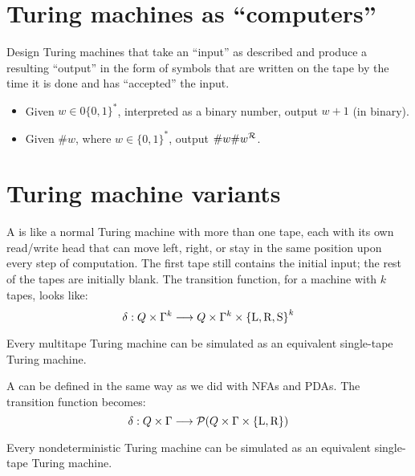 \documentclass[twoside,letterpaper,openany]{book}
\begin{document}
\section{Turing machines as ``computers''}

\begin{exer3}
Design Turing machines that take an ``input'' as described and produce a resulting ``output'' in the form of symbols that are 
written on the tape by the time it is done and has ``accepted'' the input.
\begin{itemize}
\item Given $w \in 0 \{0, 1\}^*$, interpreted as a binary number, output $w + 1$ (in binary).
\item Given $\#w$, where $w \in \{0, 1\}^*$, output $\#w\#w^{\mathcal{R}}$.
\end{itemize}
\end{exer3}

\section{Turing machine variants}

\begin{defn}
A  is like a normal Turing machine with more than one tape, each with its own read/write head that can move left, right, or stay in the same position upon every step of computation. The first tape still contains the initial input; the rest of the tapes are initially blank. The transition function, for a machine with $k$ tapes, looks like:
\[ \delta : Q \times \Gamma^k \longrightarrow Q \times \Gamma^k \times \left\lbrace \textrm{L}, \textrm{R}, \textrm{S} \right\rbrace^k \]
\end{defn}

\begin{stmt3}
Every multitape Turing machine can be simulated as an equivalent single-tape Turing machine.
\end{stmt3}

\begin{defn}
A  can be defined in the same way as we did with NFAs and PDAs. The transition function becomes:
\[ \delta : Q \times \Gamma \longrightarrow \mathcal{P}(Q \times \Gamma \times \left\lbrace \textrm{L}, \textrm{R} \right\rbrace) \]
\end{defn}

\begin{stmt3}
Every nondeterministic Turing machine can be simulated as an equivalent single-tape Turing machine.
\end{stmt3}
\end{document}
